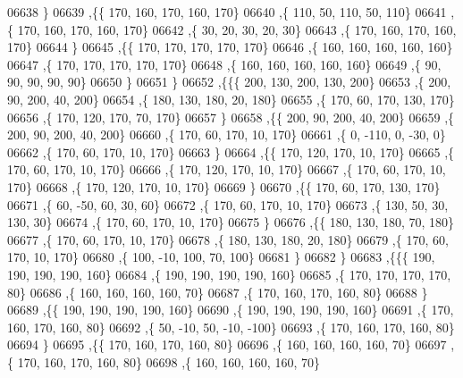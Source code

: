 \begin{DoxyCode}
06638     \}
06639    ,\{\{   170,   160,   170,   160,   170\}
06640     ,\{   110,    50,   110,    50,   110\}
06641     ,\{   170,   160,   170,   160,   170\}
06642     ,\{    30,    20,    30,    20,    30\}
06643     ,\{   170,   160,   170,   160,   170\}
06644     \}
06645    ,\{\{   170,   170,   170,   170,   170\}
06646     ,\{   160,   160,   160,   160,   160\}
06647     ,\{   170,   170,   170,   170,   170\}
06648     ,\{   160,   160,   160,   160,   160\}
06649     ,\{    90,    90,    90,    90,    90\}
06650     \}
06651    \}
06652   ,\{\{\{   200,   130,   200,   130,   200\}
06653     ,\{   200,    90,   200,    40,   200\}
06654     ,\{   180,   130,   180,    20,   180\}
06655     ,\{   170,    60,   170,   130,   170\}
06656     ,\{   170,   120,   170,    70,   170\}
06657     \}
06658    ,\{\{   200,    90,   200,    40,   200\}
06659     ,\{   200,    90,   200,    40,   200\}
06660     ,\{   170,    60,   170,    10,   170\}
06661     ,\{     0,  -110,     0,   -30,     0\}
06662     ,\{   170,    60,   170,    10,   170\}
06663     \}
06664    ,\{\{   170,   120,   170,    10,   170\}
06665     ,\{   170,    60,   170,    10,   170\}
06666     ,\{   170,   120,   170,    10,   170\}
06667     ,\{   170,    60,   170,    10,   170\}
06668     ,\{   170,   120,   170,    10,   170\}
06669     \}
06670    ,\{\{   170,    60,   170,   130,   170\}
06671     ,\{    60,   -50,    60,    30,    60\}
06672     ,\{   170,    60,   170,    10,   170\}
06673     ,\{   130,    50,    30,   130,    30\}
06674     ,\{   170,    60,   170,    10,   170\}
06675     \}
06676    ,\{\{   180,   130,   180,    70,   180\}
06677     ,\{   170,    60,   170,    10,   170\}
06678     ,\{   180,   130,   180,    20,   180\}
06679     ,\{   170,    60,   170,    10,   170\}
06680     ,\{   100,   -10,   100,    70,   100\}
06681     \}
06682    \}
06683   ,\{\{\{   190,   190,   190,   190,   160\}
06684     ,\{   190,   190,   190,   190,   160\}
06685     ,\{   170,   170,   170,   170,    80\}
06686     ,\{   160,   160,   160,   160,    70\}
06687     ,\{   170,   160,   170,   160,    80\}
06688     \}
06689    ,\{\{   190,   190,   190,   190,   160\}
06690     ,\{   190,   190,   190,   190,   160\}
06691     ,\{   170,   160,   170,   160,    80\}
06692     ,\{    50,   -10,    50,   -10,  -100\}
06693     ,\{   170,   160,   170,   160,    80\}
06694     \}
06695    ,\{\{   170,   160,   170,   160,    80\}
06696     ,\{   160,   160,   160,   160,    70\}
06697     ,\{   170,   160,   170,   160,    80\}
06698     ,\{   160,   160,   160,   160,    70\}

\end{DoxyCode}
